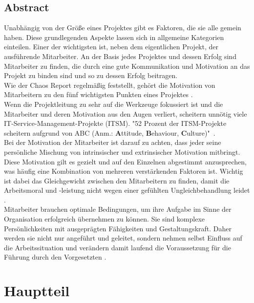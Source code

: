 \documentclass[12pt,a4paper]{scrreprt}
\begin{document}
\chapter{Abstract}
\thispagestyle{fancy}
Unabhängig von der Größe eines Projektes gibt es Faktoren, die sie alle gemein haben. Diese grundlegenden Aspekte lassen sich in allgemeine Kategorien einteilen. Einer der wichtigsten ist, neben dem eigentlichen Projekt, der ausführende Mitarbeiter. An der Basis jedes Projektes und dessen Erfolg sind Mitarbeiter zu finden, die durch eine gute Kommunikation und Motivation an das Projekt zu binden sind und so zu dessen Erfolg beitragen. \\ 
Wie der Chaos Report regelmäßig feststellt, gehört die Motivation von Mitarbeitern zu den fünf wichtigsten Punkten eines Projektes \cite{Chaosreport2014}. \\
Wenn die Projektleitung zu sehr auf die Werkzeuge fokussiert ist und die Mitarbeiter und deren Motivation aus den Augen verliert, scheitern unnötig viele IT-Service-Management-Projekte (ITSM). "52 Prozent der ITSM-Projekte scheitern aufgrund von ABC (Anm.: \textbf{A}ttitude, \textbf{B}ehaviour, \textbf{C}ulture)"\, \cite{Forrester2006}. \\[0,3cm]
Bei der Motivation der Mitarbeiter ist darauf zu achten, dass jeder seine persönliche Mischung von intrinsischer und extrinsischer Motivation mitbringt. Diese Motivation gilt es gezielt und auf den Einzelnen abgestimmt anzusprechen, was häufig eine Kombination von mehreren verstärkenden Faktoren ist. Wichtig ist dabei das Gleichgewicht zwischen den Mitarbeitern zu finden, damit die Arbeitsmoral und -leistung nicht wegen einer gefühlten Ungleichbehandlung leidet \cite{Adams1965}.\\
Mitarbeiter brauchen optimale Bedingungen, um ihre Aufgabe im Sinne der Organisation erfolgreich übernehmen zu können. Sie sind komplexe Persönlichkeiten mit ausgeprägten Fähigkeiten und Gestaltungskraft. Daher werden sie nicht nur angeführt und geleitet, sondern nehmen selbst Einfluss auf die Arbeitssituation und verändern damit laufend die Voraussetzung für die Führung durch den Vorgesetzten \cite{Lippmann2013}. \\

\part{Hauptteil}
\end{document}
